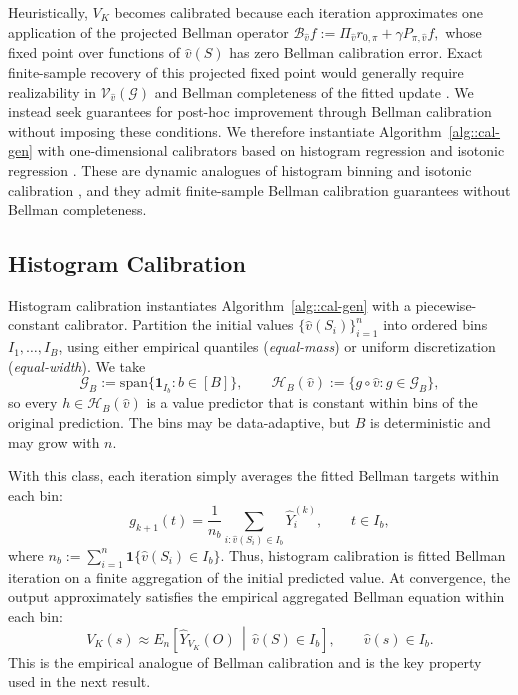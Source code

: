 \documentclass{article}
\theoremstyle{plain}
\theoremstyle{definition}
\theoremstyle{remark}
\begin{document}
Heuristically, \(V_K\) becomes calibrated because each iteration approximates
one application of the projected Bellman operator $\mathcal B_{\hat v} f
:=
\Pi_{\hat v} r_{0,\pi} + \gamma P_{\pi,\hat v} f,$ whose fixed point over functions of \(\hat v(S)\) has zero Bellman calibration
error. Exact finite-sample recovery of this projected fixed point would
generally require realizability in \(\mathcal V_{\hat v}(\mathcal G)\) and
Bellman completeness of the fitted update \citep{munos2008finite}. We instead
seek guarantees for post-hoc improvement through Bellman calibration without
imposing these conditions. We therefore instantiate Algorithm~\ref{alg::cal-gen} with one-dimensional
calibrators based on histogram regression \citep{stone1977consistent} and
isotonic regression \citep{barlow1972isotonic}. These are dynamic analogues of
histogram binning
\citep{zadrozny2001obtaining,zadrozny2002transforming,gupta2021distribution}
and isotonic calibration
\citep{zadrozny2002transforming,niculescu2005predicting,van2023causal,
van2025generalized}, and they admit finite-sample Bellman calibration
guarantees without Bellman completeness.

 

\subsection{Histogram Calibration}
\label{sec:hist}

Histogram calibration instantiates Algorithm~\ref{alg::cal-gen} with a
piecewise-constant calibrator. Partition the initial values
\(\{\hat v(S_i)\}_{i=1}^n\) into ordered bins \(I_1,\ldots,I_B\), using either
empirical quantiles (\emph{equal-mass}) or uniform discretization
(\emph{equal-width}). We take
\[
\mathcal G_B
:=
\mathrm{span}\{\mathbf 1_{I_b}:b\in[B]\},
\qquad
\mathcal H_B(\hat v)
:=
\{g\circ\hat v:g\in\mathcal G_B\},
\]
so every \(h\in\mathcal H_B(\hat v)\) is a value predictor that is constant
within bins of the original prediction. The bins may be data-adaptive, but
\(B\) is deterministic and may grow with \(n\).

With this class, each iteration simply averages the fitted Bellman targets
within each bin:
\[
g_{k+1}(t)
=
\frac{1}{n_b}
\sum_{i:\hat v(S_i)\in I_b}
\widehat Y_i^{(k)},
\qquad
t\in I_b,
\]
where \(n_b:=\sum_{i=1}^n\mathbf 1\{\hat v(S_i)\in I_b\}\). Thus, histogram
calibration is fitted Bellman iteration on a finite aggregation of the initial
predicted value. At convergence, the output approximately satisfies the empirical aggregated
Bellman equation within each bin:
\[
V_K(s)
\approx
E_n\!\left[
\widehat Y_{V_K}(O)
\,\middle|\,
\hat v(S)\in I_b
\right],
\qquad \hat v(s)\in I_b .
\]
This is the empirical analogue of Bellman calibration and is the key property
used in the next result.
\end{document}
